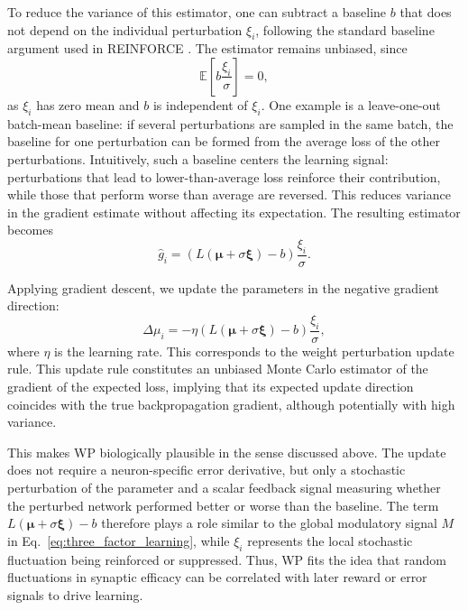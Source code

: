 To reduce the variance of this estimator, one can subtract a baseline \(b\) that does not depend on the individual perturbation \(\xi_i\), following the standard baseline argument used in REINFORCE \parencite{williams_simple_1992}. The estimator remains unbiased, since
\[
\mathbb{E}\!\left[b \frac{\xi_i}{\sigma}\right] = 0,
\]
as $\xi_i$ has zero mean and $b$ is independent of $\xi_i$. One example is a leave-one-out batch-mean baseline: if several perturbations are sampled in the same batch, the baseline for one perturbation can be formed from the average loss of the other perturbations. Intuitively, such a baseline centers the learning signal: perturbations that lead to lower-than-average loss reinforce their contribution, while those that perform worse than average are reversed. This reduces variance in the gradient estimate without affecting its expectation. The resulting estimator becomes
\begin{equation}
\widehat{g}_i
=
\left(L(\boldsymbol{\mu} + \sigma \boldsymbol{\xi}) - b\right)\frac{\xi_i}{\sigma}.
\label{eq:wp_estimator}
\end{equation}

Applying gradient descent, we update the parameters in the negative gradient direction:
\begin{equation}
\Delta \mu_i
=
-\eta
\left(L(\boldsymbol{\mu} + \sigma \boldsymbol{\xi}) - b\right)\frac{\xi_i}{\sigma},
\label{eq:wp_update}
\end{equation}
where $\eta$ is the learning rate. This corresponds to the weight perturbation update rule. This update rule constitutes an unbiased Monte Carlo estimator of the gradient of the expected loss, implying that its expected update direction coincides with the true backpropagation gradient, although potentially with high variance.

This makes WP biologically plausible in the sense discussed above. The update does not require a neuron-specific error derivative, but only a stochastic perturbation of the parameter and a scalar feedback signal measuring whether the perturbed network performed better or worse than the baseline. The term \(L(\boldsymbol{\mu}+\sigma\boldsymbol{\xi})-b\) therefore plays a role similar to the global modulatory signal \(M\) in Eq.~\eqref{eq:three_factor_learning}, while \(\xi_i\) represents the local stochastic fluctuation being reinforced or suppressed. Thus, WP fits the idea that random fluctuations in synaptic efficacy can be correlated with later reward or error signals to drive learning.


